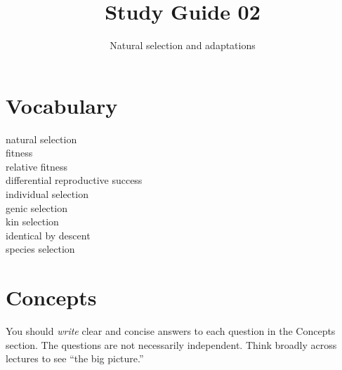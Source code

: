 \documentclass[letterpaper]{tufte-handout}
\title{Study Guide 02\hfill}
\author{Natural selection and adaptations}
\date{} %
\begin{document}
\maketitle	%


\section{Vocabulary} 
\vspace{-1\baselineskip}
\begin{multicols}{2}
natural selection\\
fitness\\
relative fitness\\
differential reproductive success\\
individual selection \\
genic selection \\
kin selection \\
identical by descent \\
species selection \\
\end{multicols}

\section{Concepts}

You should \emph{write} clear and concise answers to each question in the Concepts section.  The questions are not necessarily independent.  Think broadly across lectures to see “the big picture.”
\end{document}
